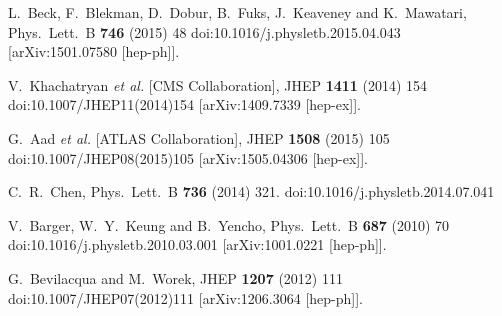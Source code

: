    L.~Beck, F.~Blekman, D.~Dobur, B.~Fuks, J.~Keaveney and K.~Mawatari,
   Phys.\ Lett.\ B {\bf 746} (2015) 48
   doi:10.1016/j.physletb.2015.04.043
   [arXiv:1501.07580 [hep-ph]].
   
   V.~Khachatryan {\it et al.} [CMS Collaboration],
   JHEP {\bf 1411} (2014) 154
   doi:10.1007/JHEP11(2014)154
   [arXiv:1409.7339 [hep-ex]].
   
  G.~Aad {\it et al.} [ATLAS Collaboration],
  JHEP {\bf 1508} (2015) 105
  doi:10.1007/JHEP08(2015)105
  [arXiv:1505.04306 [hep-ex]].
 
  C.~R.~Chen,
  Phys.\ Lett.\ B {\bf 736} (2014) 321.
  doi:10.1016/j.physletb.2014.07.041

  V.~Barger, W.~Y.~Keung and B.~Yencho,
  Phys.\ Lett.\ B {\bf 687} (2010) 70
  doi:10.1016/j.physletb.2010.03.001
  [arXiv:1001.0221 [hep-ph]].
  
  G.~Bevilacqua and M.~Worek,
  JHEP {\bf 1207} (2012) 111
  doi:10.1007/JHEP07(2012)111
  [arXiv:1206.3064 [hep-ph]].
  
